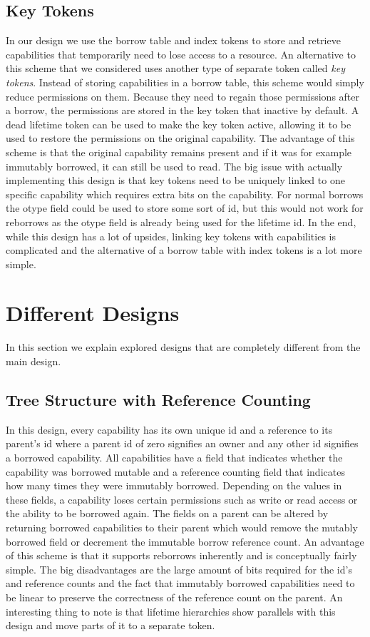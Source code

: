 \subsection{Key Tokens}
In our design we use the borrow table and index tokens to store and retrieve capabilities that temporarily need to lose access to a resource.
An alternative to this scheme that we considered uses another type of separate token called \textit{key tokens}.
Instead of storing capabilities in a borrow table, this scheme would simply reduce permissions on them.
Because they need to regain those permissions after a borrow, the permissions are stored in the key token that inactive by default.
A dead lifetime token can be used to make the key token active, allowing it to be used to restore the permissions on the original capability.
The advantage of this scheme is that the original capability remains present and if it was for example immutably borrowed, it can still be used to read.
The big issue with actually implementing this design is that key tokens need to be uniquely linked to one specific capability which requires extra bits on the capability.
For normal borrows the otype field could be used to store some sort of id, but this would not work for reborrows as the otype field is already being used for the lifetime id.
In the end, while this design has a lot of upsides, linking key tokens with capabilities is complicated and the alternative of a borrow table with index tokens is a lot more simple.

\section{Different Designs}
In this section we explain explored designs that are completely different from the main design.

\subsection{Tree Structure with Reference Counting}
In this design, every capability has its own unique id and a reference to its parent's id where a parent id of zero signifies an owner and any other id signifies a borrowed capability.
All capabilities have a field that indicates whether the capability was borrowed mutable and a reference counting field that indicates how many times they were immutably borrowed.
Depending on the values in these fields, a capability loses certain permissions such as write or read access or the ability to be borrowed again.
The fields on a parent can be altered by returning borrowed capabilities to their parent which would remove the mutably borrowed field or decrement the immutable borrow reference count.
An advantage of this scheme is that it supports reborrows inherently and is conceptually fairly simple.
The big disadvantages are the large amount of bits required for the id's and reference counts and the fact that immutably borrowed capabilities need to be linear to preserve the correctness of the reference count on the parent.
An interesting thing to note is that lifetime hierarchies show parallels with this design and move parts of it to a separate token.

